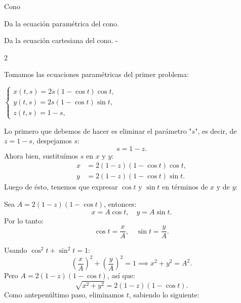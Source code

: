 \documentclass[11pt,letterpaper]{article}
\begin{document}
\begin{inciso}{Cono}
\begin{problema}{Da la ecuación paramétrica del cono.}
\end{problema}



\begin{problema}{Da la ecuación cartesiana del cono.}
-    
\begin{multicols*}{2}
    
    Tomamos las ecuaciones paramétricas del primer problema: 
    
    \begin{center}
    $
    \begin{cases}
        x( t , s) = 2s(1 - \cos t )\cos t , \\
        y( t , s) = 2s(1 - \cos t )\sin t , \\
        z( t , s) = 1 - s,
    \end{cases}
    $
\end{center}

Lo primero que debemos de hacer es eliminar el parámetro "$s$", es decir, de $z=1-s$, despejamos $s$: 
\begin{equation*}
    s=1-z.
\end{equation*}
Ahora bien, sustituímos $s$ en $x$ y $y$: 
\begin{equation*}
    \begin{split}
        x &= 2(1 - z)(1 - \cos t )\cos t , \\ 
        y &= 2(1 - z)(1 - \cos t )\sin t .
    \end{split}
\end{equation*}
Luego de ésto, tenemos que expresar $\cos t \text{ y } \sin t$ en términos de $x$ y de $y$: 

Sea $ A = 2(1 - z)(1 - \cos t) $, entonces:  
\begin{equation*}
    x = A \cos t, \quad y = A \sin t. 
\end{equation*}
Por lo tanto:  
\begin{equation*}
    \cos t = \frac{x}{A}, \quad \sin t = \frac{y}{A}.
\end{equation*} 

Usando $ \cos^2 t + \sin^2 t = 1 $:  
\begin{equation*}
    \left(\frac{x}{A}\right)^2 + \left(\frac{y}{A}\right)^2 = 1 \implies x^2 + y^2 = A^2.
\end{equation*}   
   Pero $ A = 2(1 - z)(1 - \cos t) $, así que:  
   \begin{equation*}
    \sqrt{x^2 + y^2} = 2(1 - z)(1 - \cos t).
\end{equation*} 
Como antepenúltimo paso, eliminamos $t$, sabiendo lo siguiente: 


\end{multicols*}
\end{problema}
\end{inciso}
\end{document}
